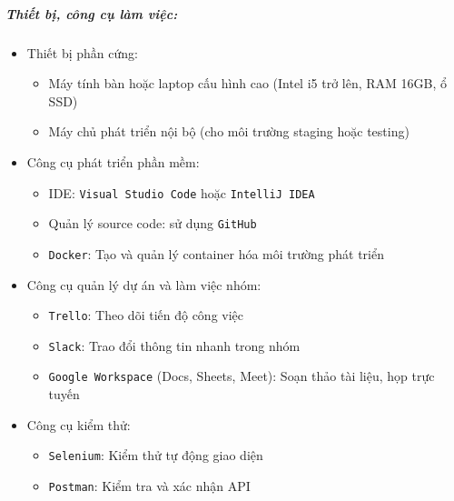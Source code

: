 \subparagraph{Thiết bị, công cụ làm việc:}
\begin{itemize}
    \item Thiết bị phần cứng:
    \begin{itemize}
        \item Máy tính bàn hoặc laptop cấu hình cao (Intel i5 trở lên, RAM 16GB, ổ SSD)
        \item Máy chủ phát triển nội bộ (cho môi trường staging hoặc testing)
    \end{itemize}
    
    \item Công cụ phát triển phần mềm:
    \begin{itemize}
        \item IDE: \texttt{Visual Studio Code} hoặc \texttt{IntelliJ IDEA}
        \item Quản lý source code: sử dụng \texttt{GitHub}
        \item \texttt{Docker}: Tạo và quản lý container hóa môi trường phát triển
    \end{itemize}
    
    \item Công cụ quản lý dự án và làm việc nhóm:
    \begin{itemize}
        \item \texttt{Trello}: Theo dõi tiến độ công việc
        \item \texttt{Slack}: Trao đổi thông tin nhanh trong nhóm
        \item \texttt{Google Workspace} (Docs, Sheets, Meet): Soạn thảo tài liệu, họp trực tuyến
    \end{itemize}
    
    \item Công cụ kiểm thử:
    \begin{itemize}
        \item \texttt{Selenium}: Kiểm thử tự động giao diện
        \item \texttt{Postman}: Kiểm tra và xác nhận API
    \end{itemize}
\end{itemize}

